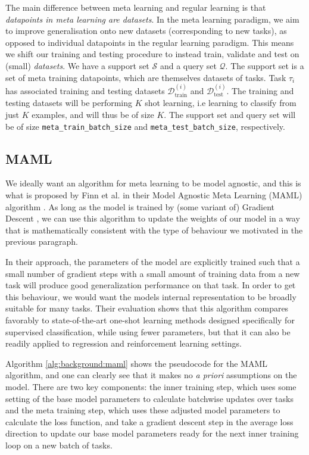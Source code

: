 {{The main difference between meta learning and regular learning is that \textit{datapoints in meta learning are datasets}. In the meta learning paradigm, we aim to improve generalisation onto new datasets (corresponding to new tasks), as opposed to individual datapoints in the regular learning paradigm. This means we shift our training and testing procedure to instead train, validate and test on (small) \textit{datasets}.  We have a support set $\mathcal{S}$ and a query set $\mathcal{Q}$. The support set is a set of meta training datapoints, which are themselves datasets of tasks. Task $\tau_i$ has associated training and testing datasets $\mathcal{D}_\text{train}^{(i)}$ and $\mathcal{D}_\text{test}^{(i)}$. The training and testing datasets will be performing $K$ shot learning, i.e learning to classify from just $K$ examples, and will thus be of size $K$. The support set and query set will be of size \texttt{meta\_train\_batch\_size} and \texttt{meta\_test\_batch\_size}, respectively.

\subsection{MAML}
We ideally want an algorithm for meta learning to be model agnostic, and this is what is proposed by Finn et al. in their Model Agnostic Meta Learning (MAML) algorithm \cite{Finn2017}. As long as the model is trained by (some variant of) Gradient Descent \cite{Ruder}, we can use this algorithm to update the weights of our model in a way that is mathematically consistent with the type of behaviour we motivated in the previous paragraph.

In their approach, the parameters of the model are explicitly trained such that a small number of gradient steps with a small amount of training data from a new task will produce good generalization performance on that task. In order to get this behaviour, we would want the models internal representation to be broadly suitable for many tasks. Their evaluation shows that this algorithm compares favorably to state-of-the-art one-shot learning methods designed specifically for supervised classification, while using fewer parameters, but that it can also be readily applied to regression and reinforcement learning settings.

Algorithm \ref{alg:background:maml} shows the pseudocode for the MAML algorithm, and one can clearly see that it makes no \textit{a priori} assumptions on the model. There are two key components: the inner training step, which uses some setting of the base model parameters to calculate batchwise updates over tasks and the meta training step, which uses these adjusted model parameters to calculate the loss function, and take a gradient descent step in the average loss direction to update our base model parameters ready for the next inner training loop on a new batch of tasks.

}}
